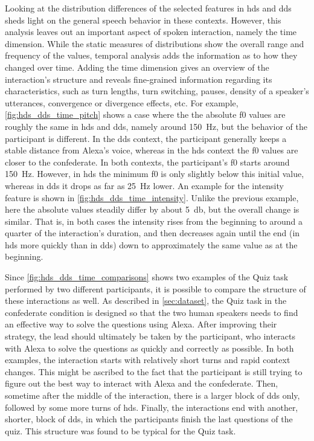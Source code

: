 Looking at the distribution differences of the selected features in \ac{hds} and \ac{dds} sheds light on the general speech behavior in these contexts.
However, this analysis leaves out an important aspect of spoken interaction, namely the time dimension.
While the static measures of distributions show the overall range and frequency of the values, temporal analysis adds the information as to how they changed over time.
Adding the time dimension gives an overview of the interaction's structure and reveals fine-grained information regarding its characteristics, such as turn lengths, turn switching, pauses, density of a speaker's utterances, convergence or divergence effects, etc.
For example, \cref{fig:hds_dds_time_pitch} shows a case where the the absolute \ac{f0} values are roughly the same in \ac{hds} and \ac{dds}, namely around \SI{150}{\hertz}, but the behavior of the participant is different.
In the \ac{dds} context, the participant generally keeps a stable distance from Alexa's voice, whereas in the \ac{hds} context the \ac{f0} values are closer to the confederate.
In both contexts, the participant's \ac{f0} starts around \SI{150}{\hertz}.
However, in \ac{hds} the minimum \ac{f0} is only slightly below this initial value, whereas in \ac{dds} it drops as far as \SI{25}{\hertz} lower.
An example for the intensity feature is shown in \cref{fig:hds_dds_time_intensity}.
Unlike the previous example, here the absolute values steadily differ by about \SI{5}{\decibel}, but the overall change is similar.
That is, in both cases the intensity rises from the beginning to around a quarter of the interaction's duration, and then decreases again until the end (in \ac{hds} more quickly than in \ac{dds}) down to approximately the same value as at the beginning.

Since \cref{fig:hds_dds_time_comparisons} shows two examples of the Quiz task performed by two different participants, it is possible to compare the structure of these interactions as well.
As described in \cref{sec:dataset}, the Quiz task in the confederate condition is designed so that the two human speakers needs to find an effective way to solve the questions using Alexa.
After improving their strategy, the lead should ultimately be taken by the participant, who interacts with Alexa to solve the questions as quickly and correctly as possible.
In both examples, the interaction starts with relatively short turns and rapid context changes.
This might be ascribed to the fact that the participant is still trying to figure out the best way to interact with Alexa and the confederate.
Then, sometime after the middle of the interaction, there is a larger block of \ac{dds} only, followed by some more turns of \ac{hds}.
Finally, the interactions end with another, shorter, block of \ac{dds}, in which the participants finish the last questions of the quiz.
This structure was found to be typical for the Quiz task.

